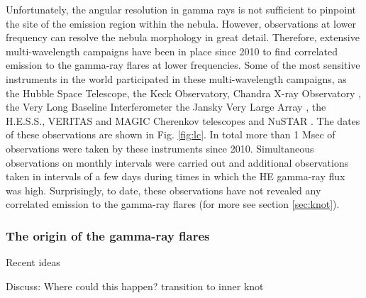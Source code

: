 Unfortunately, the angular resolution in gamma rays is not sufficient to pinpoint the site of the emission region within the nebula. However, observations at lower frequency can resolve the nebula morphology in great detail. Therefore, extensive multi-wavelength campaigns have been in place since 2010 to find correlated emission to the gamma-ray flares at lower frequencies. Some of the most sensitive instruments in the world participated in these multi-wavelength campaigns, as the Hubble Space Telescope, the Keck Observatory, Chandra X-ray Observatory \citep{Weisskopf2013,rudy2015}, the Very Long Baseline Interferometer \citep{Lobanov2011}  the Jansky Very Large Array \citep{Bietenholz2014}, the H.E.S.S., VERITAS and MAGIC Cherenkov telescopes \citep{Abramowski2014,Aliu2014,Aleksic2015} and NuSTAR \citep{Madsen2015}. The dates of these observations are shown in Fig. \ref{fig:lc}. In total more than 1 Msec of observations were taken by these  instruments since 2010. Simultaneous observations on monthly intervals were carried out and additional observations taken in intervals of a few days during times in which the HE gamma-ray flux was high. Surprisingly, to date, these observations have not revealed any correlated emission to the gamma-ray flares (for more see section \ref{sec:knot}). 

\subsubsection{The origin of the gamma-ray flares}

Recent ideas  \cite{2016arXiv160403179Y}\cite{2015arXiv151205426Z}\cite{2016arXiv160304850N}\cite{2016arXiv160305731L}

Discuss: Where could this happen? transition to inner knot
